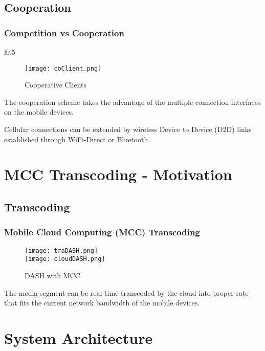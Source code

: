 \documentclass[table]{beamer}
\begin{document}
\subsection{Cooperation}
\begin{frame}
	\frametitle{Competition vs Cooperation}	
\begin{wrapfigure}{l}{0.5\textwidth}
  \vspace{-20pt}
	\begin{figure}[htbp]
    \centering
		\texttt{[image: coClient.png]}
    \caption{Cooperative Clients}
    \label{fig:coclient}
    \end{figure}
  \vspace{-20pt}
\end{wrapfigure}
The cooperation scheme takes the advantage of the {\color{red} multiple connection interfaces} on the mobile devices. 

Cellular connections can be {\color{red} extended} by wireless Device to Device (D2D) links established through WiFi-Direct or Bluetooth.
\end{frame}

\section{MCC Transcoding - Motivation}
\subsection{Transcoding}
\begin{frame}
	\frametitle{Mobile Cloud Computing (MCC) Transcoding}
  \vspace{-20pt}
	\begin{figure}[htbp]
    \centering
		\texttt{[image: traDASH.png]}\\
		\texttt{[image: cloudDASH.png]}  
    \caption{DASH with MCC}
    \label{fig:dash}
    \end{figure}
  
  \vspace{-20pt}
The media segment can be real-time transcoded by the cloud into proper rate that fits the current network bandwidth of the mobile devices.
\end{frame}

\section{System Architecture}
\end{document}
